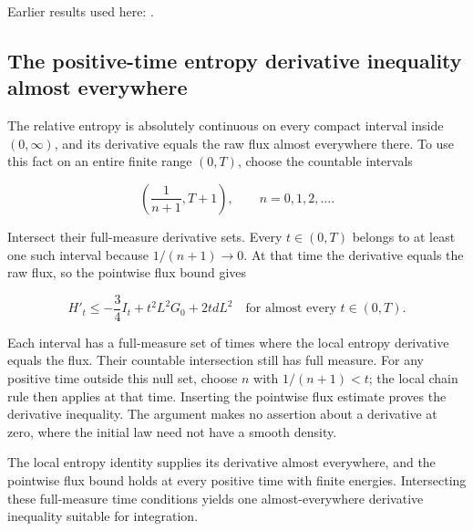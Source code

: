 \documentclass[11pt,a4paper]{report}
\begin{document}
Earlier results used here: \cite[Section~3.26.3]{LangevinLean2026ULASC}.
\subsection{\texorpdfstring{The positive-time entropy derivative inequality almost everywhere}{The positive-time entropy derivative inequality almost everywhere}}
\label{report-step-UnadjustedLangevin-LSI-GaussianEntropyProduction-lean-7}


The relative entropy is absolutely continuous on every compact interval inside \((0,\infty)\), and its derivative equals the raw flux almost everywhere there. To use this fact on an entire finite range \((0,T)\), choose the countable intervals

\[\left(\frac1{n+1},T+1\right),\qquad n=0,1,2,\ldots.\]

Intersect their full-measure derivative sets. Every \(t\in(0,T)\) belongs to at least one such interval because \(1/(n+1)\to0\). At that time the derivative equals the raw flux, so the pointwise flux bound gives

\[H'_t\le-\frac34 I_t+t^2L^2G_0+2tdL^2\quad\text{for almost every }t\in(0,T).\]

Each interval has a full-measure set of times where the local entropy derivative equals the flux. Their countable intersection still has full measure. For any positive time outside this null set, choose \(n\) with \(1/(n+1)<t\); the local chain rule then applies at that time. Inserting the pointwise flux estimate proves the derivative inequality. The argument makes no assertion about a derivative at zero, where the initial law need not have a smooth density.



The local entropy identity supplies its derivative almost everywhere, and the pointwise flux bound holds at every positive time with finite energies. Intersecting these full-measure time conditions yields one almost-everywhere derivative inequality suitable for integration.
\end{document}
